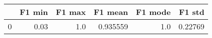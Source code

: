 \begin{tabular}{lrrrrr}
\toprule
{} &  F1 min &  F1 max &   F1 mean &  F1 mode &   F1 std \\
\midrule
0 &    0.03 &     1.0 &  0.935559 &      1.0 &  0.22769 \\
\bottomrule
\end{tabular}

